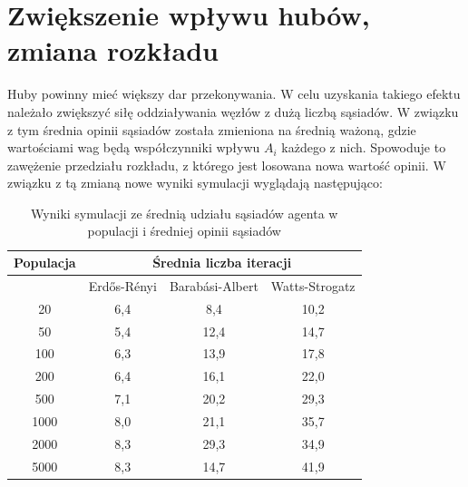 \section{Zwiększenie wpływu hubów, zmiana rozkładu}

Huby powinny mieć większy dar przekonywania. W celu uzyskania takiego efektu należało zwiększyć siłę oddziaływania węzłów z dużą liczbą sąsiadów.
W związku z tym średnia opinii sąsiadów została zmieniona na średnią ważoną, gdzie wartościami wag będą współczynniki wpływu $A_i$ każdego z nich.
Spowoduje to zawężenie przedziału rozkładu, z którego jest losowana nowa wartość opinii.
W związku z tą zmianą nowe wyniki symulacji wyglądają następująco:
\begin{table}[htbp]
    \centering
    \begin{tabular}{c|c|c|c}
        \hline
        Populacja & \multicolumn{3}{c}{Średnia liczba iteracji}                                    \\
        \hline
                  & Erdős-Rényi                                 & Barabási-Albert & Watts-Strogatz \\
        \hline
        20        & 6,4                                         & 8,4             & 10,2           \\
        50        & 5,4                                         & 12,4            & 14,7           \\
        100       & 6,3                                         & 13,9            & 17,8           \\
        200       & 6,4                                         & 16,1            & 22,0           \\
        500       & 7,1                                         & 20,2            & 29,3           \\
        1000      & 8,0                                         & 21,1            & 35,7           \\
        2000      & 8,3                                         & 29,3            & 34,9           \\
        5000      & 8,3                                         & 14,7            & 41,9           \\
    \end{tabular}
    \caption{Wyniki symulacji ze średnią udziału sąsiadów agenta w populacji i średniej opinii sąsiadów}
    \label{tab:results_with_neighbour_opinion_weighted_average}
\end{table}

